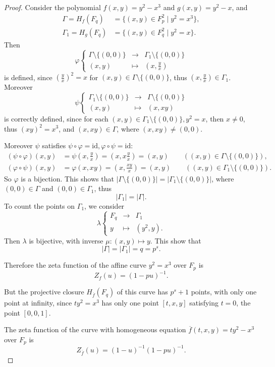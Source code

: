 \documentclass[11pt,a4paper]{article}
\begin{document}
\begin{proof}
Consider the polynomial $f(x,y) = y^2 - x^3$ and $g(x,y) = y^2 - x$, and
\begin{align*}
\Gamma =H_f(F_q) &= \{(x,y) \in F_p^2 \mid y^2 = x^3\},\\
\Gamma_1 = H_g(F_q) &= \{(x,y)\in F_q^2 \mid y^2 = x\}.
\end{align*}
Then 
$$
\varphi
\left\{
\begin{array}{ccl}
\Gamma \setminus \{(0,0)\}  & \to &\Gamma_1\setminus \{(0,0)\} \\
(x,y) & \mapsto & \left(x,\frac{y}{x} \right)
\end{array}
\right.
$$
is defined, since $\left(\frac{y}{x} \right) ^2 = x$ for $(x,y) \in \Gamma \setminus \{(0,0)\}$, thus $ \left(x,\frac{y}{x} \right) \in \Gamma_1$.
Moreover
$$
\psi
\left\{
\begin{array}{ccl}
 \Gamma_1\setminus \{(0,0)\} & \to & \Gamma \setminus \{(0,0)\} \\
(x,y) & \mapsto & \left(x,xy \right)
\end{array}
\right.
$$
is correctly defined, since for each $(x,y) \in \Gamma_1\setminus \{(0,0)\}, y^2 = x$, then $x \ne 0$, thus $(xy)^2 =x^3$, and $(x,xy) \in \Gamma$, where $(x,xy) \ne (0,0)$.

Moreover $\psi$ satisfies $\psi \circ \varphi = \mathrm{id}, \varphi \circ \psi = \mathrm{id}$:
\begin{align*}
(\psi \circ \varphi)(x,y) &= \psi\left(x,\frac{y}{x} \right) =\left (x, x \frac{y}{x}\right) = (x,y) \qquad ((x,y) \in \Gamma \setminus \{(0,0)\}),\\
(\varphi \circ \psi)(x,y) &= \varphi(x,xy) = \left( x, \frac{xy}{x} \right) = (x,y) \qquad ((x,y) \in \Gamma_1 \setminus \{(0,0)\}).
\end{align*}
So $\varphi$ is a bijection. This shows that $| \Gamma \setminus \{(0,0)\} | =  |\Gamma_1\setminus \{(0,0)\}|$, where $(0,0) \in \Gamma$ and $(0,0) \in \Gamma_1$, thus
$$|\Gamma_1| = |\Gamma|.$$ 
To count the points on $\Gamma_1$, we consider
$$\lambda
\left\{
\begin{array}{ccl}
F_q & \to & \Gamma_1\\
y & \mapsto & (y^2,y).
\end{array}
\right.
$$
Then $\lambda$ is bijective, with inverse $\mu : (x,y) \mapsto y$. This show that $$|\Gamma| = |\Gamma_1| = q = p^s.$$

Therefore the zeta function of the affine curve $y^2 = x^3$ over $F_p$ is 
$$Z_f(u) = (1-pu)^{-1}.$$

But the projective closure $H_{\overline{f}}(F_q)$ of this curve has $p^s + 1$ points, with only one point at infinity, since $ty^2 = x^3$ has only one point $[t,x,y]$ satisfying $t= 0$, the point $[0,0,1]$.

The zeta function of the curve with homogeneous equation $\overline{f}(t,x,y) = ty^2 - x^3$ over $F_p$ is 
$$Z_{\overline{f}}(u) = (1-u)^{-1} (1-pu)^{-1}.$$
\end{proof}
\end{document}
